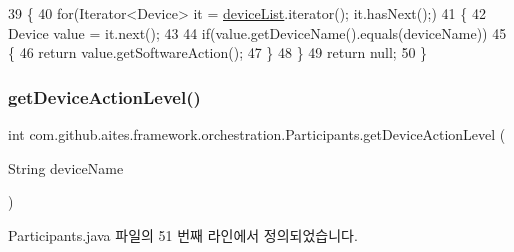 \begin{DoxyCode}
39                                                     \{
40         \textcolor{keywordflow}{for}(Iterator<Device> it = \mbox{\hyperlink{classcom_1_1github_1_1aites_1_1framework_1_1orchestration_1_1_participants_ab90ca1b5cf16aec6e3e6608df4a8d2ad}{deviceList}}.iterator(); it.hasNext();)
41         \{
42             Device value = it.next();
43             
44             \textcolor{keywordflow}{if}(value.getDeviceName().equals(deviceName))
45             \{
46                 \textcolor{keywordflow}{return} value.getSoftwareAction();
47             \}
48         \}
49         \textcolor{keywordflow}{return} null;
50     \}
\end{DoxyCode}
\mbox{\label{classcom_1_1github_1_1aites_1_1framework_1_1orchestration_1_1_participants_a513cf30ee884a0ccb53e2edc613a622e}} 
\subsubsection{\texorpdfstring{get\+Device\+Action\+Level()}{getDeviceActionLevel()}}
{\footnotesize\ttfamily int com.\+github.\+aites.\+framework.\+orchestration.\+Participants.\+get\+Device\+Action\+Level (\begin{DoxyParamCaption}\item[{String}]{device\+Name }\end{DoxyParamCaption})}



Participants.\+java 파일의 51 번째 라인에서 정의되었습니다.



